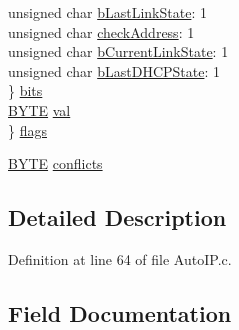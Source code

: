 \begin{DoxyCompactItemize}
\begin{tabbing}
\>\>unsigned char \hyperlink{struct_a_u_t_o_i_p___c_l_i_e_n_t___v_a_r_s_aa0e2685b9eaec4043519ef8deed3d32e}{bLastLinkState}: 1\\
\>\>unsigned char \hyperlink{struct_a_u_t_o_i_p___c_l_i_e_n_t___v_a_r_s_a8a566ef527d5ad000529b5dfbb57614c}{checkAddress}: 1\\
\>\>unsigned char \hyperlink{struct_a_u_t_o_i_p___c_l_i_e_n_t___v_a_r_s_a76cc50fdac6b613896366f0bda7f0847}{bCurrentLinkState}: 1\\
\>\>unsigned char \hyperlink{struct_a_u_t_o_i_p___c_l_i_e_n_t___v_a_r_s_ae750c5d312fa3ba700da0555d0701619}{bLastDHCPState}: 1\\
\>\} \hyperlink{struct_a_u_t_o_i_p___c_l_i_e_n_t___v_a_r_s_aa285c762ac4b7c460607b9951be30344}{bits}\\
\>\hyperlink{_generic_type_defs_8h_a4ae1dab0fb4b072a66584546209e7d58}{BYTE} \hyperlink{struct_a_u_t_o_i_p___c_l_i_e_n_t___v_a_r_s_a5986ea8162aa0f6608b36b20964044dd}{val}\\
\} \hyperlink{struct_a_u_t_o_i_p___c_l_i_e_n_t___v_a_r_s_a359f2a84d30780e91191aa6242e36206}{flags}\\

\end{tabbing}\item 
\hyperlink{_generic_type_defs_8h_a4ae1dab0fb4b072a66584546209e7d58}{B\+Y\+T\+E} \hyperlink{struct_a_u_t_o_i_p___c_l_i_e_n_t___v_a_r_s_a7eb4ab99c68eb4cadfcb0918b763b0fd}{conflicts}
\end{DoxyCompactItemize}


\subsection{Detailed Description}


Definition at line 64 of file Auto\+I\+P.\+c.



\subsection{Field Documentation}
\hypertarget{struct_a_u_t_o_i_p___c_l_i_e_n_t___v_a_r_s_a4aa6b75c6ff6cf2c2845366b06966e41}{}
